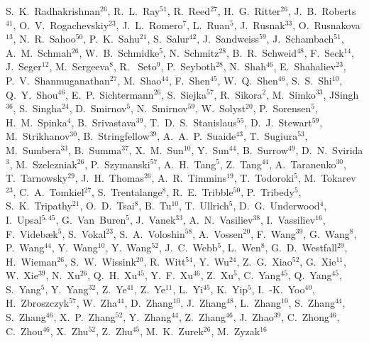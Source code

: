 \documentclass[%
 reprint,	
showpacs,
 amsmath,amssymb,
 aps,
 prc,
]{revtex4-1}
\begin{document}
{S.~K.~Radhakrishnan$^{26}$,
R.~L.~Ray$^{51}$,
R.~Reed$^{27}$,
H.~G.~Ritter$^{26}$,
J.~B.~Roberts$^{41}$,
O.~V.~Rogachevskiy$^{23}$,
J.~L.~Romero$^{7}$,
L.~Ruan$^{5}$,
J.~Rusnak$^{33}$,
O.~Rusnakova$^{13}$,
N.~R.~Sahoo$^{50}$,
P.~K.~Sahu$^{21}$,
S.~Salur$^{42}$,
J.~Sandweiss$^{59}$,
J.~Schambach$^{51}$,
A.~M.~Schmah$^{26}$,
W.~B.~Schmidke$^{5}$,
N.~Schmitz$^{28}$,
B.~R.~Schweid$^{48}$,
F.~Seck$^{14}$,
J.~Seger$^{12}$,
M.~Sergeeva$^{8}$,
R.~ Seto$^{9}$,
P.~Seyboth$^{28}$,
N.~Shah$^{46}$,
E.~Shahaliev$^{23}$,
P.~V.~Shanmuganathan$^{27}$,
M.~Shao$^{44}$,
F.~Shen$^{45}$,
W.~Q.~Shen$^{46}$,
S.~S.~Shi$^{10}$,
Q.~Y.~Shou$^{46}$,
E.~P.~Sichtermann$^{26}$,
S.~Siejka$^{57}$,
R.~Sikora$^{2}$,
M.~Simko$^{33}$,
JSingh$^{36}$,
S.~Singha$^{24}$,
D.~Smirnov$^{5}$,
N.~Smirnov$^{59}$,
W.~Solyst$^{20}$,
P.~Sorensen$^{5}$,
H.~M.~Spinka$^{4}$,
B.~Srivastava$^{39}$,
T.~D.~S.~Stanislaus$^{55}$,
D.~J.~Stewart$^{59}$,
M.~Strikhanov$^{30}$,
B.~Stringfellow$^{39}$,
A.~A.~P.~Suaide$^{43}$,
T.~Sugiura$^{53}$,
M.~Sumbera$^{33}$,
B.~Summa$^{37}$,
X.~M.~Sun$^{10}$,
Y.~Sun$^{44}$,
B.~Surrow$^{49}$,
D.~N.~Svirida$^{3}$,
M.~Szelezniak$^{26}$,
P.~Szymanski$^{57}$,
A.~H.~Tang$^{5}$,
Z.~Tang$^{44}$,
A.~Taranenko$^{30}$,
T.~Tarnowsky$^{29}$,
J.~H.~Thomas$^{26}$,
A.~R.~Timmins$^{19}$,
T.~Todoroki$^{5}$,
M.~Tokarev$^{23}$,
C.~A.~Tomkiel$^{27}$,
S.~Trentalange$^{8}$,
R.~E.~Tribble$^{50}$,
P.~Tribedy$^{5}$,
S.~K.~Tripathy$^{21}$,
O.~D.~Tsai$^{8}$,
B.~Tu$^{10}$,
T.~Ullrich$^{5}$,
D.~G.~Underwood$^{4}$,
I.~Upsal$^{5,45}$,
G.~Van~Buren$^{5}$,
J.~Vanek$^{33}$,
A.~N.~Vasiliev$^{38}$,
I.~Vassiliev$^{16}$,
F.~Videb{\ae}k$^{5}$,
S.~Vokal$^{23}$,
S.~A.~Voloshin$^{58}$,
A.~Vossen$^{20}$,
F.~Wang$^{39}$,
G.~Wang$^{8}$,
P.~Wang$^{44}$,
Y.~Wang$^{10}$,
Y.~Wang$^{52}$,
J.~C.~Webb$^{5}$,
L.~Wen$^{8}$,
G.~D.~Westfall$^{29}$,
H.~Wieman$^{26}$,
S.~W.~Wissink$^{20}$,
R.~Witt$^{54}$,
Y.~Wu$^{24}$,
Z.~G.~Xiao$^{52}$,
G.~Xie$^{11}$,
W.~Xie$^{39}$,
N.~Xu$^{26}$,
Q.~H.~Xu$^{45}$,
Y.~F.~Xu$^{46}$,
Z.~Xu$^{5}$,
C.~Yang$^{45}$,
Q.~Yang$^{45}$,
S.~Yang$^{5}$,
Y.~Yang$^{32}$,
Z.~Ye$^{41}$,
Z.~Ye$^{11}$,
L.~Yi$^{45}$,
K.~Yip$^{5}$,
I.~-K.~Yoo$^{40}$,
H.~Zbroszczyk$^{57}$,
W.~Zha$^{44}$,
D.~Zhang$^{10}$,
J.~Zhang$^{48}$,
L.~Zhang$^{10}$,
S.~Zhang$^{44}$,
S.~Zhang$^{46}$,
X.~P.~Zhang$^{52}$,
Y.~Zhang$^{44}$,
Z.~Zhang$^{46}$,
J.~Zhao$^{39}$,
C.~Zhong$^{46}$,
C.~Zhou$^{46}$,
X.~Zhu$^{52}$,
Z.~Zhu$^{45}$,
M.~K.~Zurek$^{26}$,
M.~Zyzak$^{16}$
}
\end{document}
